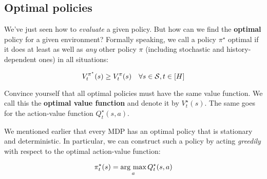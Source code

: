 \documentclass[../main/main]{subfiles}
\begin{document}
\subsection{Optimal policies}

We've just seen how to \emph{evaluate} a given policy. But how can we find the \textbf{optimal} policy for a given environment? Formally speaking, we call a policy $\pi^\star$ optimal if it does at least as well as \emph{any} other policy $\pi$ (including stochastic and history-dependent ones) in all situations:

\[
    V_t^{\pi^\star}(s) \geq V_t^\pi(s) \quad \forall s \in \S, t \in [H]
\]

Convince yourself that all optimal policies must have the same value function. We call this the \textbf{optimal value function} and denote it by $V_t^\star(s)$. The same goes for the action-value function $Q_t^\star(s, a)$.

We mentioned earlier that every MDP has an optimal policy that is stationary and deterministic. In particular, we can construct such a policy by acting \emph{greedily} with respect to the optimal action-value function:

\[
    \pi_t^\star(s) = \argmax_a Q_t^\star(s, a)
\]
\end{document}
